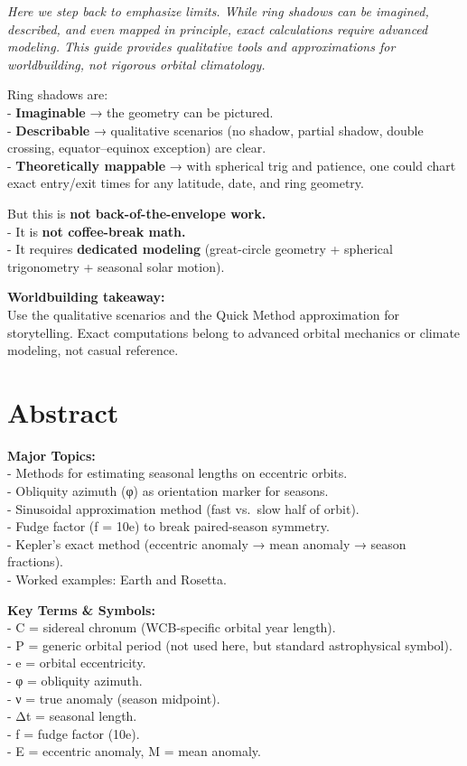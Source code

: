 \documentclass[
  letterpaper,
]{book}
\begin{document}
\emph{Here we step back to emphasize limits. While ring shadows can be
imagined, described, and even mapped in principle, exact calculations
require advanced modeling. This guide provides qualitative tools and
approximations for worldbuilding, not rigorous orbital climatology.}

Ring shadows are:\\
- \textbf{Imaginable} → the geometry can be pictured.\\
- \textbf{Describable} → qualitative scenarios (no shadow, partial
shadow, double crossing, equator--equinox exception) are clear.\\
- \textbf{Theoretically mappable} → with spherical trig and patience,
one could chart exact entry/exit times for any latitude, date, and ring
geometry.

But this is \textbf{not back-of-the-envelope work.}\\
- It is \textbf{not coffee-break math.}\\
- It requires \textbf{dedicated modeling} (great-circle geometry +
spherical trigonometry + seasonal solar motion).

\textbf{Worldbuilding takeaway:}\\
Use the qualitative scenarios and the Quick Method approximation for
storytelling. Exact computations belong to advanced orbital mechanics or
climate modeling, not casual reference.

\chapter{Abstract}\label{abstract-28}

\textbf{Major Topics:}\\
- Methods for estimating seasonal lengths on eccentric orbits.\\
- Obliquity azimuth (φ) as orientation marker for seasons.\\
- Sinusoidal approximation method (fast vs.~slow half of orbit).\\
- Fudge factor (f = 10e) to break paired-season symmetry.\\
- Kepler's exact method (eccentric anomaly → mean anomaly → season
fractions).\\
- Worked examples: Earth and Rosetta.

\textbf{Key Terms \& Symbols:}\\
- C = sidereal chronum (WCB-specific orbital year length).\\
- P = generic orbital period (not used here, but standard astrophysical
symbol).\\
- e = orbital eccentricity.\\
- φ = obliquity azimuth.\\
- ν = true anomaly (season midpoint).\\
- Δt = seasonal length.\\
- f = fudge factor (10e).\\
- E = eccentric anomaly, M = mean anomaly.
\end{document}
